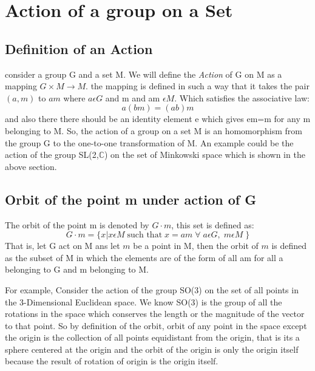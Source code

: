 
\section{Action of a group on a Set}
\subsection{Definition of an Action}
consider a group G and a set M. We will define the \textit{Action} of G on M as a mapping $G\times M \longrightarrow M $. the mapping is defined in such a way that it takes the pair $(a,m)$ to $am$ where $a \epsilon G$ and m and am $\epsilon M$. Which satisfies the associative law:
\begin{equation}
    a(bm)=(ab)m
\end{equation}
and also there there should be an identity element e which gives em=m for any m belonging to M. So, the action of a group on a set M is an homomorphism from the group G to the one-to-one transformation of M. An example could be the action of the group SL(2,$\mathbb{C}$) on the set of Minkowski space which is shown in the above section.

\subsection{Orbit of the point m under action of G}
The orbit of the point m is denoted by $G\cdot m$, this set is defined as:
\begin{equation}
    G\cdot m=\{x|x\epsilon M \; \text{such that} \; x =am \; \forall \; a\epsilon G , \; m\epsilon M \; \}
\end{equation}
That is, let G act on M ans let $m$ be a point in M, then the orbit of $m$ is defined as the subset of M in which the elements are of the form of all am for all a belonging to G and m belonging to M.

For example, Consider the action of the group SO(3) on the set of all points in the 3-Dimensional Euclidean space. We know SO(3) is the group of all the rotations in the space which conserves the length or the magnitude of the vector to that point. So by definition of the orbit, orbit of any point in the space except the origin is the collection of all points equidistant from the origin, that is its a sphere centered at the origin and the orbit of the origin is only the origin itself because the result of rotation of origin is the origin itself.


